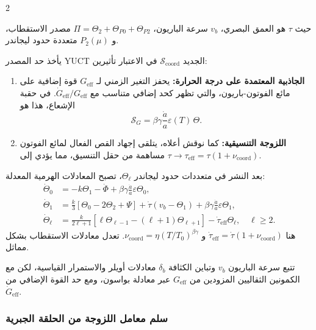 \documentclass[11pt,a4paper]{article}
\begin{document}
	\begin{multicols}{2}
		
		\noindent حيث $\tau$ هو العمق البصري، $v_b$ سرعة الباريون، $\Pi = \Theta_2 + \Theta_{P0} + \Theta_{P2}$ مصدر الاستقطاب، و $P_2(\mu)$ متعددة حدود ليجاندر.
		
		يأخذ حد المصدر YUCT الجديد $\mathcal{S}_{\mathrm{coord}}$ في الاعتبار تأثيرين:
		\begin{enumerate}
			\item \textbf{الجاذبية المعتمدة على درجة الحرارة:} يحفز التغير الزمني لـ $G_{\mathrm{eff}}$ قوة إضافية على مائع الفوتون-باريون، والتي تظهر كحد إضافي متناسب مع $\dot{G}_{\mathrm{eff}}/G_{\mathrm{eff}}$. في حقبة الإشعاع، هذا هو
			\begin{equation}
				\mathcal{S}_G = \beta\gamma \frac{\dot{a}}{a} \varepsilon(T) \, \Theta.
			\end{equation}
			\item \textbf{اللزوجة التنسيقية:} كما نوقش أعلاه، يتلقى إجهاد القص الفعال لمائع الفوتون مساهمة من حقل التنسيق، مما يؤدي إلى $\tau \to \tau_{\mathrm{eff}} = \tau (1 + \nu_{\mathrm{coord}})$.
		\end{enumerate}
		
		بعد النشر في متعددات حدود ليجاندر $\Theta_\ell$، تصبح المعادلات الهرمية المعدلة:
		\begin{align}
			\dot{\Theta}_0 &= -k\Theta_1 - \dot{\Phi} + \beta\gamma \frac{\dot{a}}{a} \varepsilon \Theta_0, \label{eq:hier0}\\
			\dot{\Theta}_1 &= \frac{k}{3}\left[\Theta_0 - 2\Theta_2 + \Psi\right] + \dot{\tau}(v_b - \Theta_1) + \beta\gamma \frac{\dot{a}}{a} \varepsilon \Theta_1, \label{eq:hier1}\\
			\dot{\Theta}_\ell &= \frac{k}{2\ell+1}\left[\ell\Theta_{\ell-1} - (\ell+1)\Theta_{\ell+1}\right] - \dot{\tau}_{\mathrm{eff}}\Theta_\ell, \quad \ell \ge 2. \label{eq:hier_ell}
		\end{align}
		هنا $\dot{\tau}_{\mathrm{eff}} = \dot{\tau}(1 + \nu_{\mathrm{coord}})$ و $\nu_{\mathrm{coord}} = \eta (T/T_0)^{\beta\gamma}$. تعدل معادلات الاستقطاب بشكل مماثل.
		
		تتبع سرعة الباريون $v_b$ وتباين الكثافة $\delta_b$ معادلات أويلر والاستمرار القياسية، لكن مع الكمونين الثقاليين المزودين من $G_{\mathrm{eff}}$ عبر معادلة بواسون، ومع حد القوة الإضافي من $\dot{G}_{\mathrm{eff}}$.
		
		\subsubsection{سلم معامل اللزوجة من الحلقة الجبرية}
		\label{subsubsec:viscosity_scaling}
		

\end{multicols}
\end{document}
